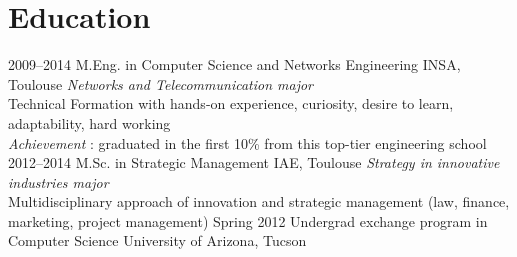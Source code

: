 \documentclass[]{friggeri-cv} %
\begin{document}

\section{Education}

\begin{entrylist}
\entry
{2009--2014}
{M.Eng. {\normalfont in Computer Science and Networks Engineering}}
{INSA, Toulouse}
{\emph{Networks and Telecommunication major}\\
Technical Formation with hands-on experience, curiosity, desire to learn, adaptability, hard working\\
\emph{Achievement} : graduated in the first 10\% from this top-tier engineering school
\vspace{.2cm}}
\entry
{2012--2014}
{M.Sc. {\normalfont in Strategic Management}}
{IAE, Toulouse}
{\emph{Strategy in innovative industries major}\\
Multidisciplinary approach of innovation and strategic management (law, finance, marketing, project management)
\vspace{-.2cm}}
\entry
{Spring 2012}
{Undergrad exchange program {\normalfont in Computer Science}}
{University of Arizona, Tucson}
{\vspace{-10pt}}
\end{entrylist}

\end{document}
